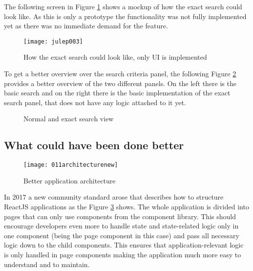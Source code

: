 The following screen in Figure \ref{fig:julep003} shows a mockup of how the exact search could look like. As this is only a prototype the functionality was not fully implemented yet as there was no immediate demand for the feature.\newline

\begin{figure}[H]
  \centering
  \texttt{[image: julep003]}
  \caption{How the exact search could look like, only UI is implemented}
  \label{fig:julep003}
\end{figure}

To get a better overview over the search criteria panel, the following Figure \ref{fig:julep004} provides a better overview of the two different panels. On the left there is the basic search and on the right there is the basic implementation of the exact search panel, that does not have any logic attached to it yet.\newline

\begin{figure}[H]
  \centering
  \hspace{3cm}
  \caption{Normal and exact search view} 
  \label{fig:julep004}
\end{figure} 

\subsection{What could have been done better} \label{ssec:donebetter}

\begin{figure}
  \centering
  \texttt{[image: 011architecturenew]}
  \caption{Better application architecture}
  \label{fig:architecturenew}
\end{figure}

In 2017 a new community standard arose that describes how to structure ReactJS applications as the Figure \ref{fig:architecturenew} shows. The whole application is divided into pages that can only use components from the component library. This should encourage developers even more to handle state and state-related logic only in one component (being the page component in this case) and pass all necessary logic down to the child components. This ensures that application-relevant logic is only handled in page components making the application much more easy to understand and to maintain.

